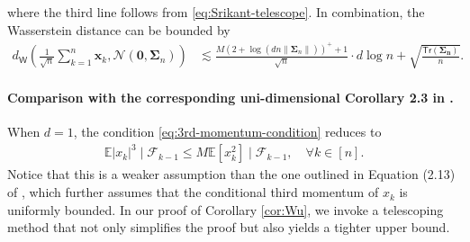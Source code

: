 where the third line follows from \eqref{eq:Srikant-telescope}. In combination, the Wasserstein distance can be bounded by
\begin{align*}
d_{\mathsf{W}}\left(\frac{1}{\sqrt{n}}\sum_{k=1}^n \bm{x}_k,\mathcal{N}(\bm{0},\bm{\Sigma}_n)\right) &\lesssim \frac{M(2+\log(dn\|\bm{\Sigma}_n\|))^+ + 1}{\sqrt{n}}\cdot d\log n+ \sqrt{\frac{\mathsf{Tr}(\bm{\Sigma_n})}{n}}.
\end{align*}


\paragraph{Comparison with the corresponding uni-dimensional Corollary 2.3 in \cite{rollin2018}.} When $d=1$, the condition \eqref{eq:3rd-momentum-condition} reduces to
\begin{align*}
\mathbb{E}|x_k|^3\mid \mathcal{F}_{k-1} \leq M \mathbb{E}[x_k^2]\mid \mathcal{F}_{k-1}, \quad \forall k \in [n].
\end{align*}
Notice that this is a weaker assumption than the one outlined in Equation (2.13) of \cite{rollin2018}, which further assumes that the conditional third momentum of $x_k$ is uniformly bounded. In our proof of Corollary \ref{cor:Wu}, we invoke a telescoping method that not only simplifies the proof but also yields a tighter upper bound.

